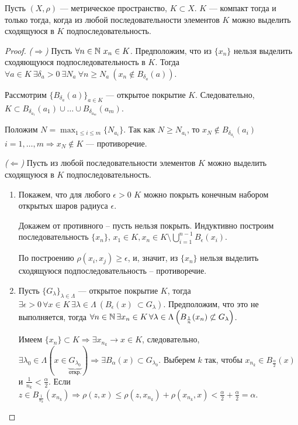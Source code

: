 \begin{theorem}
    \label{compact-criterion}
    Пусть $(X, \rho)$ --- метрическое пространство, $K \subset X$. $K$ --- компакт тогда и только тогда, когда из любой последовательности элементов $K$ можно выделить сходящуюся в $K$ подпоследовательность.

    \begin{proof}
        \emph{($\Rightarrow$)} Пусть $\forall n \in \mathbb{N} \ x_n \in K$. Предположим, что из $\{x_n\}$ нельзя выделить сходяющуюся подпоследовательность в $K$. Тогда $\forall a \in K \ \exists \delta_a > 0 \ \exists N_a \ \forall n \ge N_a \ (x_n \not\in B_{\delta_a}(a))$.

        Рассмотрим $\{B_{\delta_a}(a)\}_{a \in K}$ --- открытое покрытие $K$. Следовательно, $K \subset B_{\delta_{a_1}}(a_1) \cup \ldots \cup B_{\delta_{a_m}}(a_m)$.
    
        Положим $N = \max_{1 \le i \le m} \{N_{a_i}\}$. Так как $N \ge N_{a_i}$, то $x_N \not\in B_{\delta_{a_i}}(a_i)$ $i = 1, \ldots, m \Rightarrow x_N \not\in K$ --- противоречие.
    
        \emph{($\Leftarrow$)} Пусть из любой последовательности элементов $K$ можно выделить сходящуюся в $K$ подпоследовательность.

        \begin{enumerate}
            \item Покажем, что для любого $\epsilon > 0$ $K$ можно покрыть конечным набором открытых шаров радиуса $\epsilon$.
    
            Докажем от противного -- пусть нельзя покрыть. Индуктивно построим последовательность $\{x_n\}$, $x_1 \in K, x_n \in K \setminus \bigcup_{i = 1}^{n - 1} B_\epsilon(x_i)$.
    
            По построению $\rho(x_i, x_j) \geq \epsilon$, и, значит, из $\{x_n\}$ нельзя выделить сходящуюся подпоследовательность -- противоречие.
    
            \item Пусть $\{G_\lambda\}_{\lambda \in \Lambda}$ --- открытое покрытие $K$, тогда $\exists \epsilon > 0 \, \forall x \in K \, \exists \lambda \in \Lambda \ \left(B_\epsilon(x) \ \subset G_\lambda\right)$. Предположим, что это не выполняется, тогда $\forall n \in \mathbb{N} \, \exists x_n \in K \, \forall \lambda \in \Lambda \left(B_{\frac{1}{n}}(x_n) \not\subset G_\lambda\right)$.
    
            Имеем $\{x_n\} \subset K \Rightarrow \exists x_{n_k} \rightarrow x \in K$, следовательно, $\exists \lambda_0 \in \Lambda (x \in \underbrace{G_{\lambda_0}}_{\text{откр.}}) \Rightarrow \exists B_{\alpha}(x) \subset G_{\lambda_0}$. Выберем $k$ так, чтобы $x_{n_k} \in B_{\frac{\alpha}{2}}(x)$ и $\frac{1}{n_k} < \frac{\alpha}{2}$. Если $z \in B_{\frac{1}{n_k}}(x_{n_k}) \Rightarrow \rho(z, x) \le \rho(z, x_{n_k}) + \rho(x_{n_k}, x) < \frac{\alpha}{2} + \frac{\alpha}{2} = \alpha$.
    

\end{enumerate}
\end{proof}
\end{theorem}
